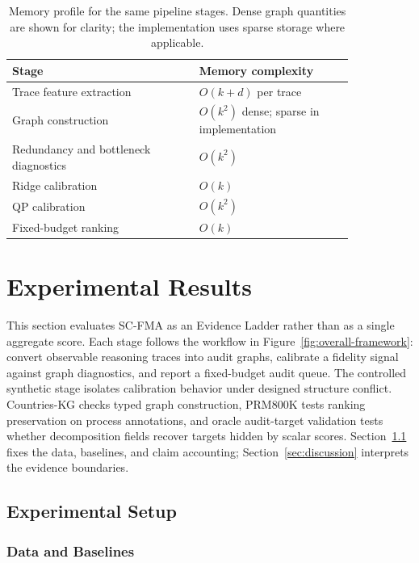 \documentclass[a4paper,fleqn]{cas-sc}
\begin{document}
\begin{table}[ht]
\caption{Memory profile for the same pipeline stages. Dense graph quantities are shown for clarity; the implementation uses sparse storage where applicable.}
\label{tab:memory-summary}
\centering
\small
\renewcommand{\arraystretch}{1.08}
\begin{tabular}{p{0.46\linewidth}p{0.38\linewidth}}
\toprule
\textbf{Stage} & \textbf{Memory complexity} \\
\midrule
Trace feature extraction & $O(k+d)$ per trace \\
Graph construction & $O(k^2)$ dense; sparse in implementation \\
Redundancy and bottleneck diagnostics & $O(k^2)$ \\
Ridge calibration & $O(k)$ \\
QP calibration & $O(k^2)$ \\
Fixed-budget ranking & $O(k)$ \\
\bottomrule
\end{tabular}
\end{table}

\FloatBarrier

\section{Experimental Results}
\label{sec:application}
\label{sec:experimental-results}

This section evaluates SC-FMA as an Evidence Ladder rather than as a single aggregate score. Each stage follows the workflow in Figure~\ref{fig:overall-framework}: convert observable reasoning traces into audit graphs, calibrate a fidelity signal against graph diagnostics, and report a fixed-budget audit queue. The controlled synthetic stage isolates calibration behavior under designed structure conflict. Countries-KG checks typed graph construction, PRM800K tests ranking preservation on process annotations, and oracle audit-target validation tests whether decomposition fields recover targets hidden by scalar scores. Section~\ref{sec:application-setup} fixes the data, baselines, and claim accounting; Section~\ref{sec:discussion} interprets the evidence boundaries.

\subsection{Experimental Setup}
\label{sec:application-setup}

\subsubsection{Data and Baselines}
\end{document}
